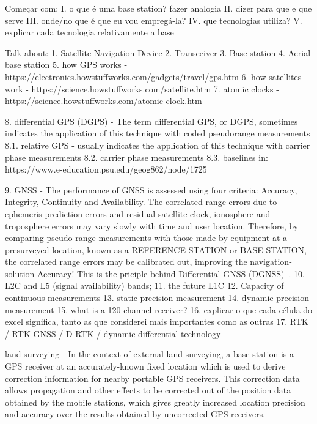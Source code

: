 Começar com:
I. o que é uma base station? fazer analogia
II. dizer para que e que serve
III. onde/no que é que eu vou empregá-la?
IV. que tecnologias utiliza?
V. explicar cada tecnologia relativamente a base

Talk about:
    1. Satellite Navigation Device
    2. Transceiver
    3. Base station
    4. Aerial base station
    5. how GPS works - https://electronics.howstuffworks.com/gadgets/travel/gps.htm
    6. how satellites work - https://science.howstuffworks.com/satellite.htm
    7. atomic clocks - https://science.howstuffworks.com/atomic-clock.htm

    8. differential GPS (DGPS) - The term differential GPS, or DGPS, sometimes indicates the application of this technique with coded pseudorange measurements
    8.1. relative GPS - usually indicates the application of this technique with carrier phase measurements
    8.2. carrier phase measurements
    8.3. baselines
    in: https://www.e-education.psu.edu/geog862/node/1725

    9. GNSS - The performance of GNSS is assessed using four criteria: Accuracy, Integrity, Continuity and Availability. The correlated range errors due to ephemeris prediction errors and residual satellite clock, ionosphere and troposphere errors may vary slowly with time and user location.
    Therefore, by comparing pseudo-range measurements with those made by equipment at a presurveyed location, known as a REFERENCE STATION or BASE STATION, the correlated range errors may be calibrated out, improving the navigation-solution Accuracy! This is the priciple behind Differential GNSS (DGNSS)~\cite{edseee_9101092}. %
    10. L2C and L5 (signal availability) bands;
    11. the future L1C
    12. Capacity of continuous measurements
    13. static precision measurement
    14. dynamic precision measurement
    15. what is a 120-channel receiver?
    16. explicar o que cada célula do excel significa, tanto as que considerei mais importantes como as outras
    17. RTK / RTK-GNSS / D-RTK / dynamic differential technology~\cite{ayers_geosystems_2011}
       
    land surveying - In the context of external land surveying, a base station is a GPS receiver at an accurately-known fixed location which is used to derive correction information for nearby portable GPS receivers. This correction data allows propagation and other effects to be corrected out of the position data obtained by the mobile stations, which gives greatly increased location precision and accuracy over the results obtained by uncorrected GPS receivers.

